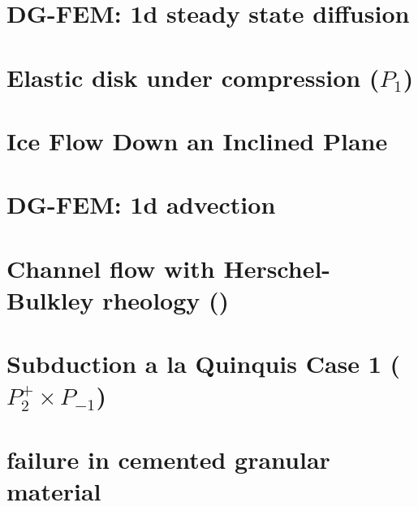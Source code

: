 \documentclass[a4paper,11pt]{report}
\begin{document}
\chapter{DG-FEM: 1d steady state diffusion \label{f57}} %

\chapter{Elastic disk under compression ($P_1$) \label{f58}} %

\chapter{Ice Flow Down an Inclined Plane \label{f59}} %

\chapter{DG-FEM: 1d advection \label{f60}} %

\chapter{Channel flow with Herschel-Bulkley rheology (\QtwoQone) \label{f61}} %

\chapter{Subduction a la Quinquis Case 1 ($P_2^+\times P_{-1}$) \label{f62}} %

\chapter{failure in cemented granular material \label{f63}} %
\end{document}
